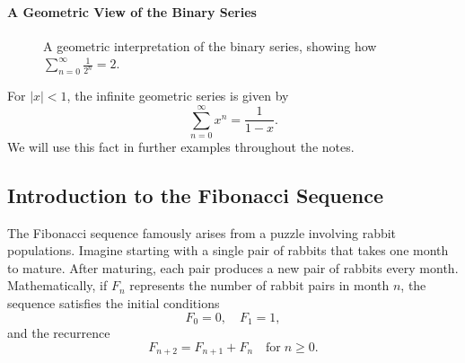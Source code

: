 \documentclass{article}
\begin{document}
\paragraph{A Geometric View of the Binary Series}
\begin{figure}[ht]
  \centering
\caption{A geometric interpretation of the binary series, showing how 
\(\sum_{n=0}^{\infty} \tfrac{1}{2^n} = 2\).}
\end{figure}
For \(|x| < 1\), the infinite geometric series is given by
\[
\sum_{n=0}^{\infty} x^n = \frac{1}{1 - x}.
\]
We will use this fact in further examples throughout the notes.

\subsection{Introduction to the Fibonacci Sequence}
The Fibonacci sequence famously arises from a puzzle involving rabbit populations.
Imagine starting with a single pair of rabbits that takes one month to mature.
After maturing, each pair produces a new pair of rabbits every month.
Mathematically, if \(F_n\) represents the number of rabbit pairs in month \(n\),
the sequence satisfies the initial conditions
\[
F_0 = 0, \quad F_1 = 1,
\]
and the recurrence
\[
F_{n+2} = F_{n+1} + F_n \quad \text{for} \; n \ge 0.
\]
\end{document}
